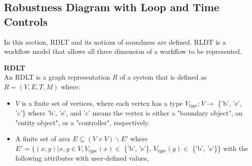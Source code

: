 \subsection*{Robustness Diagram with Loop and Time Controls}
In this section, RDLT and its notions of soundness are defined. RLDT is a workflow model that allows all three dimension of a workflow to be represented.

\begin{defn}\textbf{RDLT} \cite{Malinao2017}\\
    \label{RDLTDef}
    An RDLT is a graph representation \begin{math}R\end{math} of a system that is defined as \begin{math}R = (V, E, T, M)\end{math} where:
    \begin{itemize}
        \item \begin{math}V\end{math} is a finite set of vertices, where each vertex has a type \begin{math}V_{type}: V \rightarrow \end{math} \{'b', 'e', 'c'\} where 'b', 'e', and 'c' means the vertex is either a "boundary object", an "entity object", or a "controller", respectively.
        
        \item A finite set of arcs \begin{math}E \subseteq (V \times V) \backslash  E'\end{math} where \begin{math}E' = \{(x,y) | x,y \in V, V_{type}(x) \in \end{math} \{'b', 'e'\}, \begin{math}V_{type}(y) \in \end{math} \{'b', 'e'\}\} with the following attributes with user-defined values,
            

\end{itemize}
\end{defn}
